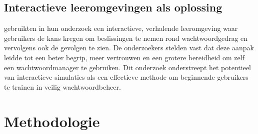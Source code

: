 \subsection{Interactieve leeromgevingen als oplossing}
\textcite{Sugatan2020} gebruikten in hun onderzoek een interactieve, verhalende leeromgeving waar gebruikers de kans kregen om beslissingen te nemen rond wachtwoordgedrag en vervolgens ook de gevolgen te zien. De onderzoekers stelden vast dat deze aanpak leidde tot een beter begrip, meer vertrouwen en een grotere bereidheid om zelf een wachtwoordmanager te gebruiken.
 Dit onderzoek onderstreept het potentieel van interactieve simulaties als een effectieve methode om beginnende gebruikers te trainen in veilig wachtwoordbeheer.

 

\section{Methodologie}%
\label{sec:methodologie}


